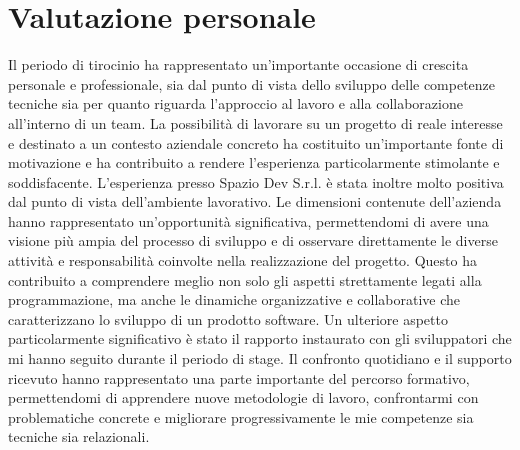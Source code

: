 \section{Valutazione personale}
Il periodo di tirocinio ha rappresentato un'importante occasione di crescita personale e professionale, sia dal punto di vista dello sviluppo delle competenze tecniche sia per quanto riguarda l'approccio al lavoro 
e alla collaborazione all'interno di un team. La possibilità di lavorare su un progetto di reale interesse e destinato a un contesto aziendale concreto ha costituito un'importante fonte di motivazione e ha 
contribuito a rendere l'esperienza particolarmente stimolante e soddisfacente.
\newline
L'esperienza presso Spazio Dev S.r.l. è stata inoltre molto positiva dal punto di vista dell'ambiente lavorativo. Le dimensioni contenute dell'azienda hanno rappresentato un'opportunità significativa, permettendomi 
di avere una visione più ampia del processo di sviluppo e di osservare direttamente le diverse attività e responsabilità coinvolte nella realizzazione del progetto. Questo ha contribuito a comprendere meglio non 
solo gli aspetti strettamente legati alla programmazione, ma anche le dinamiche organizzative e collaborative che caratterizzano lo sviluppo di un prodotto software.
\newline
Un ulteriore aspetto particolarmente significativo è stato il rapporto instaurato con gli sviluppatori che mi hanno seguito durante il periodo di stage. Il confronto quotidiano e il supporto ricevuto hanno 
rappresentato una parte importante del percorso formativo, permettendomi di apprendere nuove metodologie di lavoro, confrontarmi con problematiche concrete e migliorare progressivamente le mie competenze sia 
tecniche sia relazionali.




\newpage
